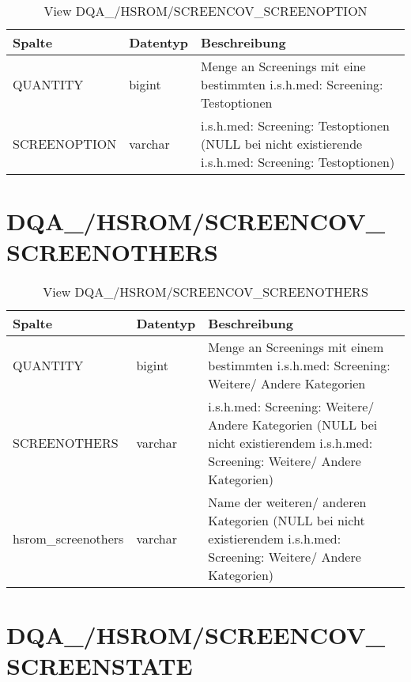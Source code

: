   \begin{table}[ht]
    \centering
    \caption{View DQA\_/HSROM/SCREENCOV\_SCREENOPTION}
    \label{tab:dqa/hsrom/screencovscreenoption}
    \begin{tabular}{||l|l|p{10cm}||}
      \hline
      Spalte & Datentyp & Beschreibung \\ [0.5ex] \hline \hline
      QUANTITY & bigint & Menge an Screenings mit eine bestimmten i.s.h.med: Screening: Testoptionen \\ \hline
      SCREENOPTION & varchar & i.s.h.med: Screening: Testoptionen (NULL bei nicht existierende i.s.h.med: Screening: Testoptionen)\\ \hline
    \end{tabular}
  \end{table}
  \clearpage
  \section{DQA\_/HSROM/SCREENCOV\_\\ SCREENOTHERS}

  \begin{table}[ht]
    \centering
    \caption{View DQA\_/HSROM/SCREENCOV\_SCREENOTHERS}
    \label{tab:dqa/hsrom/screencovscreenothers}
    \begin{tabular}{||l|l|p{10cm}||}
      \hline
      Spalte & Datentyp & Beschreibung \\ [0.5ex] \hline \hline
      QUANTITY & bigint & Menge an Screenings mit einem bestimmten i.s.h.med: Screening: Weitere/ Andere Kategorien \\ \hline
      SCREENOTHERS & varchar & i.s.h.med: Screening: Weitere/ Andere Kategorien (NULL bei nicht existierendem i.s.h.med: Screening: Weitere/ Andere Kategorien)\\ \hline
       hsrom\_screenothers & varchar & Name der weiteren/ anderen Kategorien (NULL bei nicht existierendem i.s.h.med: Screening: Weitere/ Andere Kategorien)\\ \hline
    \end{tabular}
  \end{table}

  \section{DQA\_/HSROM/SCREENCOV\_\\ SCREENSTATE}

